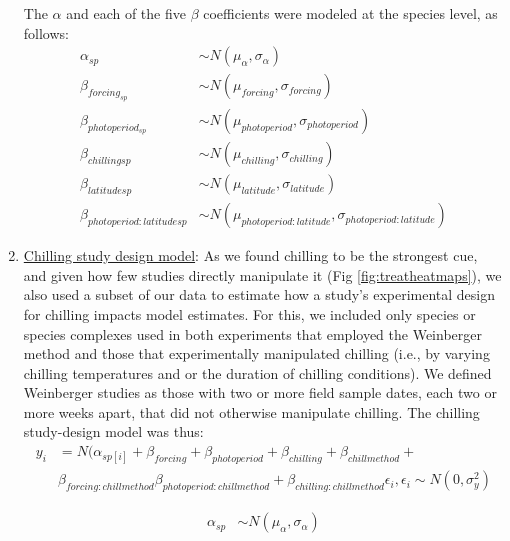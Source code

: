 \documentclass{article}
\begin{document}
\begin{enumerate}
\noindent The $\alpha$ and each of the five $\beta$ coefficients were modeled at the species level, as follows:
\begin{align*}
\alpha_{sp} &  \sim N(\mu_{\alpha}, \sigma_{\alpha}) \\
\beta_{forcing_{sp}} & \sim N(\mu_{forcing}, \sigma_{forcing}) \\
\beta_{photoperiod_{sp}} & \sim N(\mu_{photoperiod}, \sigma_{photoperiod})\\
\beta_{chilling{sp}} & \sim N(\mu_{chilling}, \sigma_{chilling})\\
\beta_{latitude{sp}} & \sim N(\mu_{latitude}, \sigma_{latitude})\\
\beta_{photoperiod : latitude{sp}} & \sim N(\mu_{photoperiod : latitude}, \sigma_{photoperiod : latitude})
\end{align*}


\item \underline{Chilling study design model}:
As we found chilling to be the strongest cue, and given how few studies directly manipulate it (Fig \ref{fig:treatheatmaps}), we also used a subset of our data to estimate how a study's experimental design for chilling impacts model estimates. For this, we included only species or species complexes used in both experiments that employed the Weinberger method \citep[in this method plant tissue is sequentially removed from the field followed and then exposed to `forcing' conditions, with the assumption that tissues collected later experience more field chilling][]{weinberger1950} and those that experimentally manipulated chilling (i.e., by varying chilling temperatures and or the duration of chilling conditions). We defined Weinberger studies as those with two or more field sample dates, each two or more weeks apart, that did not otherwise manipulate chilling. The chilling study-design model was thus:
\begin{align*}
y_i &= N(\alpha_{sp[i]} + \beta_{forcing} + \beta_{photoperiod} + \beta_{chilling}+ \beta_{chillmethod} + \\ & \beta_{forcing:chillmethod} \beta_{photoperiod:chillmethod}+ \beta_{chilling:chillmethod} \epsilon_{i}, \epsilon_{i} \sim N(0,\sigma^2_y)
\end{align*}

\begin{align*}
\alpha_{sp} & \sim N(\mu_{\alpha}, \sigma_{\alpha}) \\
\end{align*}

\end{enumerate}
\end{document}

